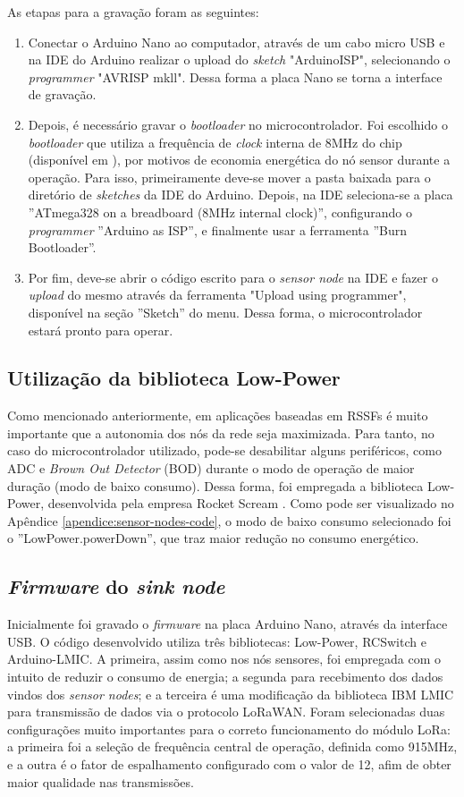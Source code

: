 \documentclass[oneside,openright,12pt]{ufsm_2015} %
\begin{document}
    As etapas para a gravação foram as seguintes:
    \begin{enumerate}
        \item Conectar o Arduino Nano ao computador, através de um cabo micro USB e na IDE do Arduino realizar o upload do \textit{sketch} "ArduinoISP", selecionando o \textit{programmer} "AVRISP mkll". Dessa forma a placa Nano se torna a interface de gravação.
        \item Depois, é necessário gravar o \textit{bootloader} no microcontrolador. Foi escolhido o \textit{bootloader} que utiliza a frequência de \textit{clock} interna de 8MHz do chip (disponível em \cite{bootloader-8mhz}), por motivos de economia energética do nó sensor durante a operação. Para isso, primeiramente deve-se mover a pasta baixada para o diretório de \textit{sketches} da IDE do Arduino. Depois, na IDE seleciona-se a placa ''ATmega328 on a breadboard (8MHz internal clock)'', configurando o \textit{programmer} ''Arduino as ISP'', e finalmente usar a ferramenta ''Burn Bootloader''.
        \item Por fim, deve-se abrir o código escrito para o \textit{sensor node} na IDE e fazer o \textit{upload} do mesmo através da ferramenta "Upload using programmer", disponível na seção ''Sketch'' do menu. Dessa forma, o microcontrolador estará pronto para operar.
    \end{enumerate}
    
    \subsection{Utilização da biblioteca Low-Power}
    Como mencionado anteriormente, em aplicações baseadas em RSSFs é muito importante que a autonomia dos nós da rede seja maximizada. Para tanto, no caso do microcontrolador utilizado, pode-se desabilitar alguns periféricos, como ADC e \textit{Brown Out Detector} (BOD) durante o modo de operação de maior duração (modo de baixo consumo). Dessa forma, foi empregada a biblioteca Low-Power, desenvolvida pela empresa Rocket Scream \cite{low-power-lib}. Como pode ser visualizado no Apêndice \ref{apendice:sensor-nodes-code}, o modo de baixo consumo selecionado foi o ''LowPower.powerDown'', que traz maior redução no consumo energético.
    
    \subsection{\textit{Firmware} do \textit{sink node}}
    Inicialmente foi gravado o \textit{firmware} na placa Arduino Nano, através da interface USB. O código desenvolvido utiliza três bibliotecas: Low-Power, RCSwitch e Arduino-LMIC. A primeira, assim como nos nós sensores, foi empregada com o intuito de reduzir o consumo de energia; a segunda para recebimento dos dados vindos dos \textit{sensor nodes}; e a terceira é uma modificação da biblioteca IBM LMIC para transmissão de dados via o protocolo LoRaWAN. Foram selecionadas duas configurações muito importantes para o correto funcionamento do módulo LoRa: a primeira foi a seleção de frequência central de operação, definida como 915MHz, e a outra é o fator de espalhamento configurado com o valor de 12, afim de obter maior qualidade nas transmissões.
    
\end{document}

